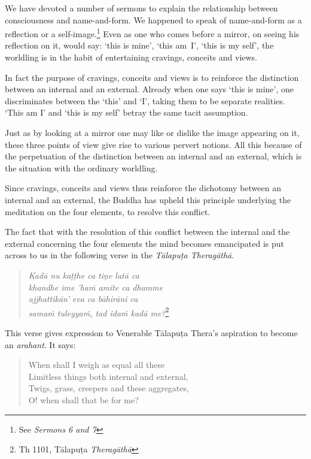 We have devoted a number of sermons to explain the relationship between consciousness and name-and-form. We happened to speak of name-and-form as a reflection or a self-image.\footnote{See \emph{Sermons 6 and 7}} Even as one who comes before a mirror, on seeing his reflection on it, would say: `this is mine', `this am~I', `this is my self', the worldling is in the habit of entertaining cravings, conceits and views.

In fact the purpose of cravings, conceits and views is to reinforce the distinction between an internal and an external. Already when one says `this is mine', one discriminates between the `this' and `I', taking them to be separate realities. `This am I' and `this is my self' betray the same tacit assumption.

Just as by looking at a mirror one may like or dislike the image appearing on it, these three points of view give rise to various pervert notions. All this because of the perpetuation of the distinction between an internal and an external, which is the situation with the ordinary worldling.

Since cravings, conceits and views thus reinforce the dichotomy between an internal and an external, the Buddha has upheld this principle underlying the meditation on the four elements, to resolve this conflict.

The fact that with the resolution of this conflict between the internal and the external concerning the four elements the mind becomes emancipated is put across to us in the following verse in the \emph{Tālapuṭa Theragāthā}.

\enlargethispage{\baselineskip}

\begin{quote}
\emph{Kadā nu kaṭṭhe ca tiṇe latā ca}\\
\emph{khandhe ime 'haṁ amite ca dhamme}\\
\emph{ajjhattikān' eva ca bāhirāni ca}\\
\emph{samaṁ tuleyyaṁ, tad idaṁ kadā me?}\footnote{Th 1101, Tālapuṭa \emph{Theragāthā}}
\end{quote}

This verse gives expression to Venerable Tālapuṭa Thera's aspiration to become an \emph{arahant}. It says:

\begin{quote}
When shall I weigh as equal all these\\
Limitless things both internal and external,\\
Twigs, grass, creepers and these aggregates,\\
O! when shall that be for me?
\end{quote}

